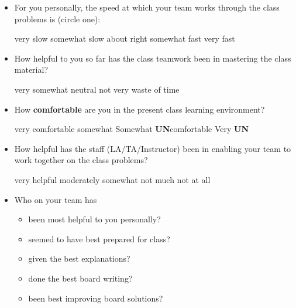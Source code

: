 \documentclass[handout]{mcs}
\begin{document}
\begin{itemize}

\item For you personally, the speed at which your team works through
  the class problems is (circle one):

very slow\hspace{0.4in} somewhat slow\hspace{0.4in} about
right\hspace{0.4in} somewhat fast\hspace{0.4in} very fast

\item How helpful to you so far has the class teamwork been in
  mastering the class material?

very\hspace{0.5in} somewhat \hspace{0.5in} neutral\hspace{0.5in} not
very \hspace{0.5in} waste of time

\item How \textbf{comfortable} are you in the present class learning environment?

very comfortable \hspace{0.5in} somewhat\hspace{0.5in}
Somewhat \textbf{UN}comfortable \hspace{0.5in} Very \textbf{UN}

\item How helpful has the staff (LA/TA/Instructor) been in enabling
  your team to work together on the class problems?

very helpful \hspace{0.5in} moderately\hspace{0.5in}
somewhat \hspace{0.5in} not much \hspace{0.5in} not at all

\item Who on your team has
  \begin{itemize}
    \item been most helpful to you personally?\hfill\brule{2in}
    \item seemed to have best prepared for class?\hfill\brule{2in}
    \item given the best explanations?\hfill\brule{2in}
    \item done the best board writing?\hfill\brule{2in}
    \item been best improving board solutions?\hfill\brule{2in}
  \end{itemize}


\end{itemize}
\end{document}
